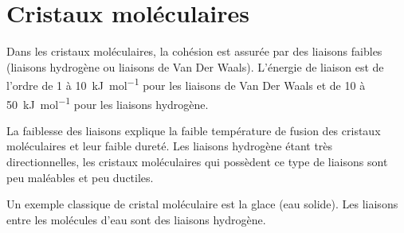 \documentclass{cours}
\begin{document}
\section{Cristaux moléculaires}%
\label{sec:cristaux_moleculaires}
Dans les cristaux moléculaires, la cohésion est assurée par des liaisons faibles (liaisons hydrogène ou liaisons de Van Der Waals). L'énergie de liaison est de l'ordre de 1 à \SI{10}{\kilo\joule\per\mole} pour les liaisons de Van Der Waals et de 10 à \SI{50}{\kilo\joule\per\mole} pour les liaisons hydrogène. 

La faiblesse des liaisons explique la faible température de fusion des cristaux moléculaires et leur faible dureté. 
Les liaisons hydrogène étant très directionnelles, les cristaux moléculaires qui possèdent ce type de liaisons sont peu maléables et peu ductiles.

Un exemple classique de cristal moléculaire est la glace (eau solide). Les liaisons entre les molécules d'eau sont des liaisons hydrogène. 
\end{document}
